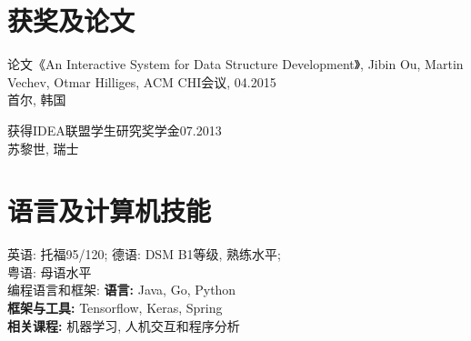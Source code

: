 \documentclass[11pt]{article} %
\begin{document}
\begin{minipage}[t]{0.44\textwidth}

\section{获奖及论文} 
\begin{inparaitem}
\item \normalsize{论文《An Interactive System for Data Structure Development》,  Jibin Ou, Martin Vechev, Otmar Hilliges, ACM CHI会议, \hfill\normalsize04.2015\\\small{首尔, 韩国}\par}
\item \normalsize{获得IDEA联盟学生研究奖学金\hfill\normalsize07.2013\\\small{苏黎世, 瑞士}\par}
\end{inparaitem}
\par

\section{语言及计算机技能}
\normalsize
英语: 托福95/120; 德语: DSM B1等级, 熟练水平; 
\\ 粤语: 母语水平\\
编程语言和框架: 
\textbf{语言: }Java, Go, Python\\
\textbf{框架与工具: }Tensorflow, Keras, Spring\\
\textbf{相关课程:} 机器学习, 人机交互和程序分析\\


\end{minipage} %
\end{document}
